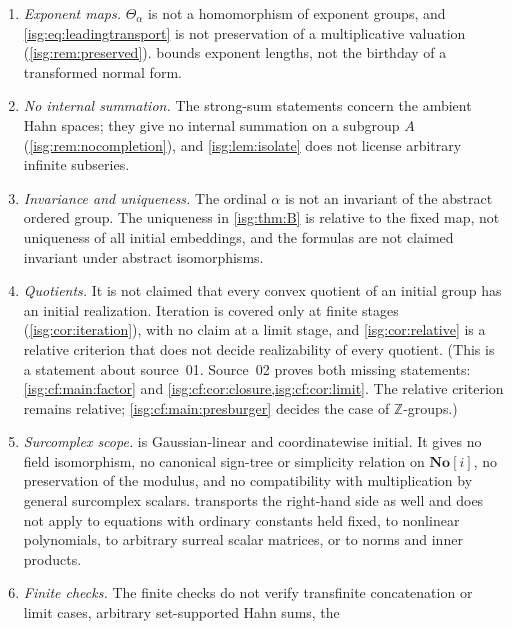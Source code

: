 \documentclass[11pt]{article}
\theoremstyle{definition}
\theoremstyle{remark}
\newcommand{\No}{\ensuremath{\mathbf{No}}}
\newcommand{\Z}{\mathbb{Z}}
\begin{document}
\begin{enumerate}[label=\textup{(N\arabic*)},leftmargin=*]
      groups admitting initial embeddings is claimed, and the
      initial-monoid problem (Question~3 of \cite{EK}, Question~9.2 of
      the journal version) is not addressed.
\item \emph{Exponent maps.} $\Theta_\alpha$ is not a homomorphism of
      exponent groups, and \eqref{isg:eq:leadingtransport} is not
      preservation of a multiplicative valuation
      (\cref{isg:rem:preserved}).  bounds exponent
      lengths, not the birthday of a transformed normal form.
\item \emph{No internal summation.} The strong-sum statements concern the
      ambient Hahn spaces; they give no internal summation on a subgroup
      $A$ (\cref{isg:rem:nocompletion}), and \cref{isg:lem:isolate} does
      not license arbitrary infinite subseries.
\item \emph{Invariance and uniqueness.} The ordinal $\alpha$ is not an
      invariant of the abstract ordered group. The uniqueness in
      \cref{isg:thm:B} is relative to the fixed map, not uniqueness of all
      initial embeddings, and the formulas are not claimed invariant under
      abstract isomorphisms.
\item \emph{Quotients.} It is not claimed that every convex quotient of
      an initial group has an initial realization. Iteration is covered
      only at finite stages (\cref{isg:cor:iteration}), with no claim at a
      limit stage, and \cref{isg:cor:relative} is a relative criterion
      that does not decide realizability of every quotient. (This is a
      statement about source~01. Source~02 proves both missing
      statements: \cref{isg:cf:main:factor} and
      \cref{isg:cf:cor:closure,isg:cf:cor:limit}. The relative criterion
      remains relative; \cref{isg:cf:main:presburger} decides the case of
      $\Z$-groups.)
\item \emph{Surcomplex scope.}  is Gaussian-linear
      and coordinatewise initial. It gives no field isomorphism, no
      canonical sign-tree or simplicity relation on $\No[i]$, no
      preservation of the modulus, and no compatibility with
      multiplication by general surcomplex scalars. 
      transports the right-hand side as well and does not apply to
      equations with ordinary constants held fixed, to nonlinear
      polynomials, to arbitrary surreal scalar matrices, or to norms and
      inner products.
\item \emph{Finite checks.} The finite checks do not verify transfinite
      concatenation or limit cases, arbitrary set-supported Hahn sums, the

\end{enumerate}
\end{document}
